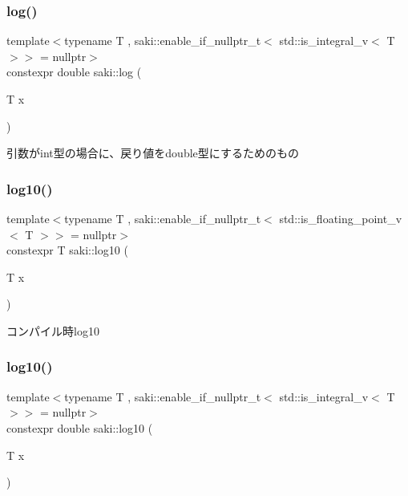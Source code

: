 \subsubsection{\texorpdfstring{log()}{log()}\hspace{0.1cm}{\footnotesize\ttfamily [2/2]}}
{\footnotesize\ttfamily template$<$typename T , saki\+::enable\+\_\+if\+\_\+nullptr\+\_\+t$<$ std\+::is\+\_\+integral\+\_\+v$<$ T $>$$>$  = nullptr$>$ \\
constexpr double saki\+::log (\begin{DoxyParamCaption}\item[{T}]{x }\end{DoxyParamCaption})}



引数がint型の場合に、戻り値をdouble型にするためのもの 

\mbox{\label{namespacesaki_aa1a5f3dfe15009e9e985b8b0647211e6}} 
\subsubsection{\texorpdfstring{log10()}{log10()}\hspace{0.1cm}{\footnotesize\ttfamily [1/2]}}
{\footnotesize\ttfamily template$<$typename T , saki\+::enable\+\_\+if\+\_\+nullptr\+\_\+t$<$ std\+::is\+\_\+floating\+\_\+point\+\_\+v$<$ T $>$$>$  = nullptr$>$ \\
constexpr T saki\+::log10 (\begin{DoxyParamCaption}\item[{T}]{x }\end{DoxyParamCaption})}



コンパイル時log10 

\mbox{\label{namespacesaki_a7e5fde452567de6eaae1d5c481497757}} 
\subsubsection{\texorpdfstring{log10()}{log10()}\hspace{0.1cm}{\footnotesize\ttfamily [2/2]}}
{\footnotesize\ttfamily template$<$typename T , saki\+::enable\+\_\+if\+\_\+nullptr\+\_\+t$<$ std\+::is\+\_\+integral\+\_\+v$<$ T $>$$>$  = nullptr$>$ \\
constexpr double saki\+::log10 (\begin{DoxyParamCaption}\item[{T}]{x }\end{DoxyParamCaption})}



